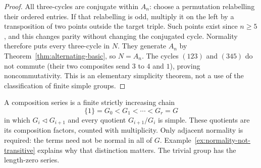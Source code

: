 \begin{proof}
All three-cycles are conjugate within $A_n$: choose a permutation relabelling their ordered entries. If that relabelling is odd, multiply it on the left by a transposition of two points outside the target triple. Such points exist since $n\geq5$, and this changes parity without changing the conjugated cycle. Normality therefore puts every three-cycle in $N$. They generate $A_n$ by Theorem~\ref{thm:alternating-basic}, so $N=A_n$. The cycles $(123)$ and $(345)$ do not commute (their two composites send $3$ to $4$ and $1$), proving noncommutativity. This is an elementary simplicity theorem, not a use of the classification of finite simple groups.
\end{proof}

A composition series is a finite strictly increasing chain
\[
 \{1\}=G_0<G_1<\cdots<G_r=G
\]
in which $G_i\mathrel{\triangleleft}G_{i+1}$ and every quotient $G_{i+1}/G_i$ is simple. These quotients are its composition factors, counted with multiplicity. Only adjacent normality is required: the terms need not be normal in all of $G$. Example~\ref{ex:normality-not-transitive} explains why that distinction matters. The trivial group has the length-zero series.

